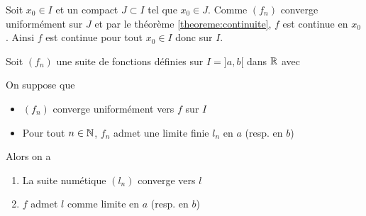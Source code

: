 \documentclass[a4paper, 12pt]{article}
\begin{document}
\begin{demonstration}
    Soit $x_0 \in I$ et un compact $J \subset I$ tel que $x_0 \in J$.
    Comme $(f_n)$ converge uniformément sur $J$ et par le théorème \ref{theoreme:continuite}, $f$ est continue en $x_0$.
    Ainsi $f$ est continue pour tout $x_0 \in I$ donc sur $I$.
\end{demonstration}

\begin{corollaire}{}{}
    Soit $(f_n)$ une suite de fonctions définies sur $I = ]a, b[$ dans $\mathbb{R}$ avec 
    
    On suppose que
    \begin{itemize}[label=--]
        \item $(f_n)$ converge uniformément vers $f$ sur $I$
        \item Pour tout $n \in \mathbb{N}$, $f_n$ admet une limite finie $l_n$ en $a$ (resp. en $b$)
    \end{itemize}
    Alors on a
    \begin{enumerate}
        \item La suite numétique $(l_n)$ converge vers $l$
        \item $f$ admet $l$ comme limite en $a$ (resp. en $b$)
    \end{enumerate}
\end{corollaire}
\end{document}
